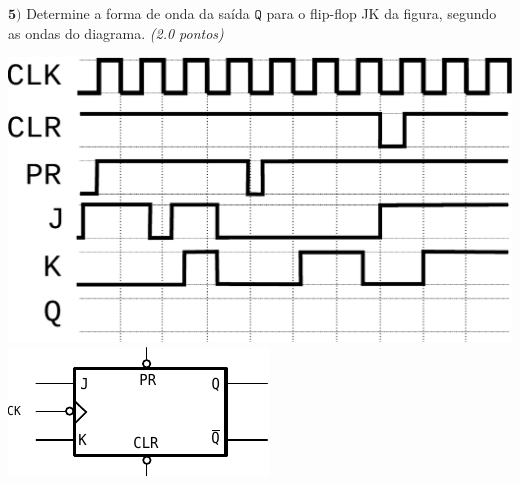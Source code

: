 \documentclass[12pt]{article}
\newcommand{\exerc}[3]{ \vspace*{25pt} {$\mathbf{#1)}$} #2 \hfill {\it #3} }
\begin{document}
\exerc{5}{Determine a forma de onda da saída $\mathtt{Q}$ para o flip-flop JK da figura, segundo as ondas do diagrama.}{(2.0 pontos)}
\\
\begin{multicols}{2}
\begin{center}
		\includegraphics[scale=0.6]{sig2} \vspace*{4cm}
\includegraphics{fp-jk} \\
\end{center}
\end{multicols}
\end{document}
